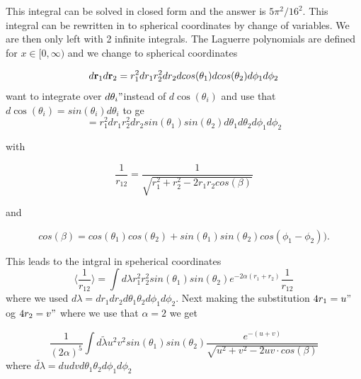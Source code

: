 \documentclass[twoside,twocolumn]{article}
\begin{document}
This integral can be solved in closed form and the answer is
$5\pi^2/16^2$.
This integral can be rewritten in to spherical coordinates by change of variables. We are then only left with 2 infinite integrals. The Laguerre
polynomials are defined for $x\in [0,\infty)$ and we change to
spherical coordinates

\[
   d{\bf r}_1d{\bf r}_2  = r_1^2dr_1 r_2^2dr_2 dcos(\theta_1)dcos(\theta_2)d\phi_1d\phi_2 
\]
want to integrate over $d\theta_i" $instead of $d\cos(\theta_i)$ and use that $d\cos(\theta_i) = sin(\theta_i)d\theta_i$ to ge
\[
= r_1^2dr_1 r_2^2dr_2 sin(\theta_1)sin(\theta_2)d\theta_1d\theta_2d\phi_1d\phi_2
\]

with

\[
   \frac{1}{r_{12}}= \frac{1}{\sqrt{r_1^2+r_2^2-2r_1r_2cos(\beta)}}
\]

and 

\[
cos(\beta) = cos(\theta_1)cos(\theta_2)+sin(\theta_1)sin(\theta_2)cos(\phi_1-\phi_2)).
\]

This leads to the intgral in speherical coordinates
\begin{equation}
	\langle \frac{1}{{r_{12}}} \rangle=\int d\lambda  r_1^2r_2^2sin(\theta_1)sin(\theta_2)e^{-2\alpha (r_1+r_2)}\frac{1}{r_{12}}
\end{equation}
where we used $d\lambda  =dr_1 dr_2d\theta_1\theta_2d\phi_1d\phi_2$. Next making the substitution $4r_1 = u"$ og $4r_2 = v"$ where we use that $\alpha = 2$ we get

\begin{equation}
	\frac{1}{(2\alpha)^5}\int d\tilde{\lambda}  u^2v^2sin(\theta_1)sin(\theta_2)\frac{e^{-(u+v)}}{\sqrt{u^2+v^2-2uv \cdot cos(\beta)}}
\end{equation} 
where  $\tilde{d\lambda}  =du dvd\theta_1\theta_2d\phi_1d\phi_2$

\end{document}
